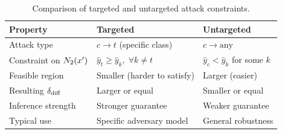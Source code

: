 \begin{table}[ht]
  \centering
  \caption{Comparison of targeted and untargeted attack constraints.}
  \label{tab:modes}
  \begin{tabular}{lll}
    \toprule
    \textbf{Property} & \textbf{Targeted} & \textbf{Untargeted} \\
    \midrule
    Attack type
      & $c \to t$ (specific class) & $c \to \text{any}$ \\
    Constraint on $N_2(x')$
      & $\hat{y}_t \ge \hat{y}_k,\;\forall k\neq t$
      & $\hat{y}_c < \hat{y}_k$ for some $k$ \\
    Feasible region    & Smaller (harder to satisfy) & Larger (easier) \\
    Resulting $\delta_{\mathrm{diff}}$    & Larger or equal & Smaller or equal \\
    Inference strength & Stronger guarantee & Weaker guarantee \\
    Typical use        & Specific adversary model & General robustness \\
    \bottomrule
  \end{tabular}
\end{table}

